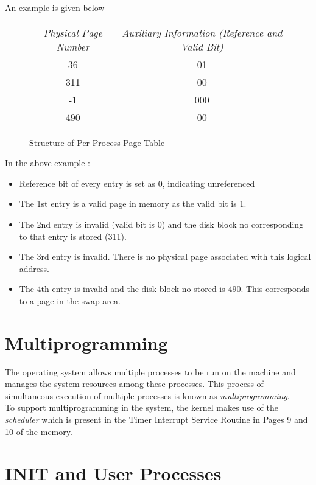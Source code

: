 \documentclass[10pt]{report}
\begin{document}
An example is given below
		\begin{figure}[htp!]
		\centering
		\begin{tabular}{|c|c|}
			\textit{Physical Page Number} & \textit{Auxiliary Information (Reference and Valid Bit)} \\
			\cline{0-1}
			36 & 01  \\
			\cline{0-1}
			311 & 00 \\
			\cline{0-1}
			-1 &  000 \\
			\cline{0-1}
			490 & 00 \\
			\cline{0-1}
		\end{tabular}
		\caption{Structure of Per-Process Page Table}
		\label{fig:processfile table}
	\end{figure}
	
	In the above example :
\begin{itemize}
	\item Reference bit of every entry is set as 0, indicating unreferenced
	\item The 1st entry is a valid page in memory as the valid bit is 1.
	\item The 2nd entry is invalid (valid bit is 0) and the disk block no corresponding to that entry is stored (311).
	\item The 3rd entry is invalid. There is no physical page associated with this logical address.
	\item The 4th entry is invalid and the disk block no stored is 490. This corresponds to a page in the swap area.
\end{itemize}		
	  
	
	
\section{Multiprogramming}
\label{sec:multiprogramming}
	
The operating system allows multiple processes to be run on the machine and manages the system resources among these processes. This process of simultaneous execution of multiple processes is known as \emph{multiprogramming}.  \\

To support multiprogramming in the system, the kernel makes use of the \emph{scheduler} which is present in the Timer Interrupt Service Routine in Pages 9 and 10 of the memory.

\section{INIT and User Processes}
\label{sec:init and userprogs}
\end{document}
